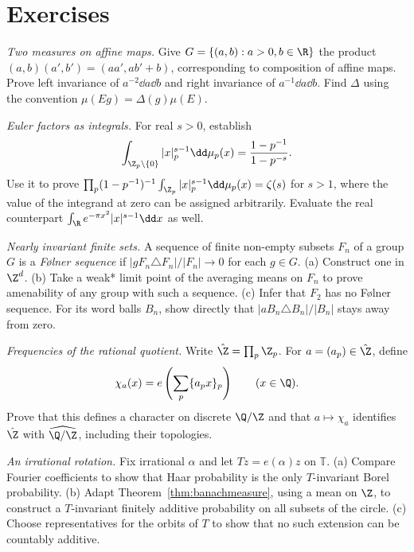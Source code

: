 \section{Exercises}

\begin{exercise}[$\star$]\label{ex:axb}
\emph{Two measures on affine maps.} Give $G=\{(a,b):a>0,b\in\R\}$ the product $(a,b)(a',b')=(aa',ab'+b)$, corresponding to composition of affine maps. Prove left invariance of $a^{-2}\dd a\dd b$ and right invariance of $a^{-1}\dd a\dd b$. Find $\Delta$ using the convention $\mu(Eg)=\Delta(g)\mu(E)$.
\end{exercise}
\begin{exercise}[$\star\star$]\label{ex:localzeta}
\emph{Euler factors as integrals.} For real $s>0$, establish
\[\int_{\Z_p\setminus\{0\}}|x|_p^{s-1}\dd\mu_p(x)=\frac{1-p^{-1}}{1-p^{-s}}.\]
Use it to prove $\prod_p(1-p^{-1})^{-1}\int_{\Z_p}|x|_p^{s-1}\dd\mu_p(x)=\zeta(s)$ for $s>1$, where the value of the integrand at zero can be assigned arbitrarily. Evaluate the real counterpart $\int_\R e^{-\pi x^2}|x|^{s-1}\dd x$ as well.
\end{exercise}
\begin{exercise}[$\star\star$]\label{ex:folner}
\emph{Nearly invariant finite sets.} A sequence of finite non-empty subsets $F_n$ of a group $G$ is a \emph{F{\o}lner sequence} if $|gF_n\triangle F_n|/|F_n|\to0$ for each $g\in G$. (a) Construct one in $\Z^d$. (b) Take a weak* limit point of the averaging means on $F_n$ to prove amenability of any group with such a sequence. (c) Infer that $F_2$ has no F{\o}lner sequence. For its word balls $B_n$, show directly that $|aB_n\triangle B_n|/|B_n|$ stays away from zero.
\end{exercise}
\begin{exercise}[$\star\star$]\label{ex:qzdual}
\emph{Frequencies of the rational quotient.} Write $\hat{\Z}=\prod_p\Z_p$. For $a=(a_p)\in\hat{\Z}$, define
\[\chi_a(x)=e\left(\sum_p\{a_px\}_p\right)\qquad(x\in\Q).\]
Prove that this defines a character on discrete $\Q/\Z$ and that $a\mapsto\chi_a$ identifies $\hat{\Z}$ with $\widehat{\Q/\Z}$, including their topologies.
\end{exercise}
\begin{exercise}[$\star\star$]\label{ex:circlerotation}
\emph{An irrational rotation.} Fix irrational $\alpha$ and let $Tz=e(\alpha)z$ on $\mathbb T$. (a) Compare Fourier coefficients to show that Haar probability is the only $T$-invariant Borel probability. (b) Adapt Theorem~\ref{thm:banachmeasure}, using a mean on $\Z$, to construct a $T$-invariant finitely additive probability on all subsets of the circle. (c) Choose representatives for the orbits of $T$ to show that no such extension can be countably additive.
\end{exercise}

